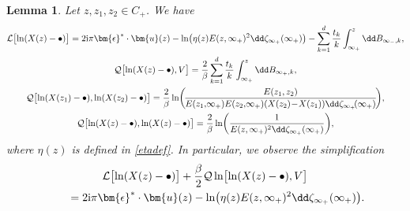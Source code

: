 \documentclass[pdftex]{sigma}
\numberwithin{equation}{section}
\newtheorem{Lemma}[Theorem]{Lemma}
\begin{document}
\begin{Lemma}
 \label{L44}
 Let $z,z_1,z_2 \in C_+$. We have
 \begin{gather*}
	 \mathcal{L}\bigl[\ln(X(z) - \bullet)\bigr]   = 2{\rm i}\pi\bm{\epsilon}^*\cdot\bm{u}(z) - \ln\bigl(\eta(z)E(z, \infty_{+})^2\dd\zeta_{\infty_{+}}(\infty_{+})\bigr) - \sum_{k = 1}^{d} \frac{t_k}{k} \int_{\infty_+}^{z} \dd B_{\infty_-,k}, \\
	 \mathcal{Q}\bigl[\ln(X(z) - \bullet),V\bigr]   = \frac{2}{\beta} \sum_{k = 1}^{d} \frac{t_k}{k} \int_{\infty_+}^{z} \dd B_{\infty_+,k}, \\
	 \mathcal{Q}\bigl[\ln(X(z_1) - \bullet), \ln(X(z_2) - \bullet)\bigr]   = \frac{2}{\beta}\ln \biggl(\!\frac{E(z_1, z_2)}{E(z_1,\!\infty_{+})E(z_2,\!\infty_+)(X(z_2) \!-\! X(z_1))\dd \zeta_{\infty_+}\!(\infty_+)}\!\biggr), \\
	 \mathcal{Q}\bigl[\ln(X(z) - \bullet),\ln(X(z) - \bullet)\bigr]   = \frac{2}{\beta}\ln\biggl(\frac{1}{E(z,\infty_+)^2\dd \zeta_{\infty_+}(\infty_+)}\biggr),
\end{gather*}
where $\eta(z)$ is defined in \eqref{etadef}. In particular, we
observe the simplification
\begin{gather} \nonumber
 \mathcal{L}\bigl[\ln(X(z) - \bullet)\bigr] + \frac{\beta}{2} \mathcal{Q}\ln\bigl[\ln(X(z) - \bullet),V\bigr] \\
 \qquad{}= 2{\rm i}\pi \bm{\epsilon}^{*} \cdot \bm{u}(z) - \ln\bigl(\eta(z)E(z, \infty_{+})^{2}\dd\zeta_{\infty_{+}}(\infty_{+})\bigr).\label{simplifLQ}
\end{gather}
\end{Lemma}
\end{document}

